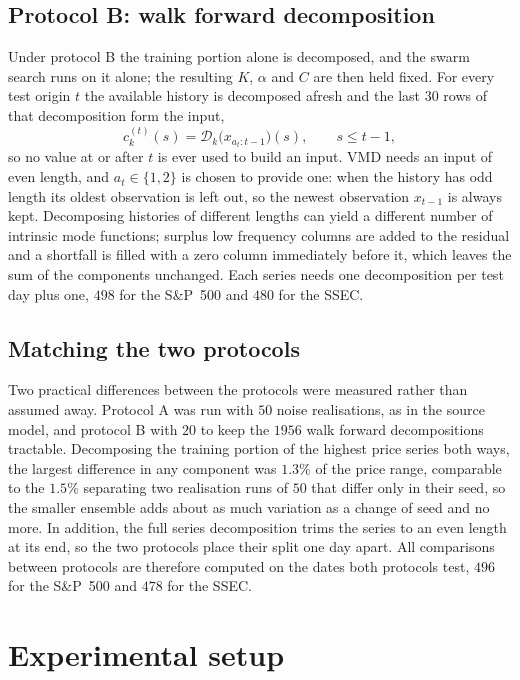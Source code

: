 \subsection{Protocol B: walk forward decomposition}
Under protocol B the training portion alone is decomposed, and the swarm
search runs on it alone; the resulting $K$, $\alpha$ and $C$ are then held
fixed. For every test origin $t$ the available history is decomposed afresh
and the last $30$ rows of that decomposition form the input,
\begin{equation}
c_k^{(t)}(s)=\mathcal{D}_k\bigl(x_{a_t:t-1}\bigr)(s),\qquad s\le t-1,
\label{eq:walkforward}
\end{equation}
so no value at or after $t$ is ever used to build an input. VMD needs an input
of even length, and $a_t\in\{1,2\}$ is chosen to provide one: when the history
has odd length its oldest observation is left out, so the newest observation
$x_{t-1}$ is always kept. Decomposing histories of different lengths can yield
a different number of intrinsic mode functions; surplus low frequency columns
are added to the residual and a shortfall is filled with a zero column
immediately before it, which leaves the sum of the components unchanged. Each
series needs one decomposition per test day plus one, $498$ for the S\&P~500
and $480$ for the SSEC.

\subsection{Matching the two protocols}
Two practical differences between the protocols were measured rather than
assumed away. Protocol A was run with $50$ noise realisations, as in the
source model, and protocol B with $20$ to keep the $1956$ walk forward
decompositions tractable. Decomposing the training portion of the highest
price series both ways, the largest difference in any component was $1.3\%$
of the price range, comparable to the $1.5\%$ separating two realisation runs
of $50$ that differ only in their seed, so the smaller ensemble adds about as
much variation as a change of seed and no more. In addition, the full series
decomposition trims the series to an even length at its end, so the two
protocols place their split one day apart. All comparisons between protocols
are therefore computed on the dates both protocols test, $496$ for the
S\&P~500 and $478$ for the SSEC.

\section{Experimental setup}\label{sec:setup}

